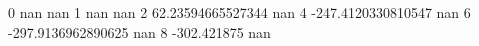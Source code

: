 0 nan nan
1 nan nan
2 62.23594665527344 nan
4 -247.4120330810547 nan
6 -297.9136962890625 nan
8 -302.421875 nan
